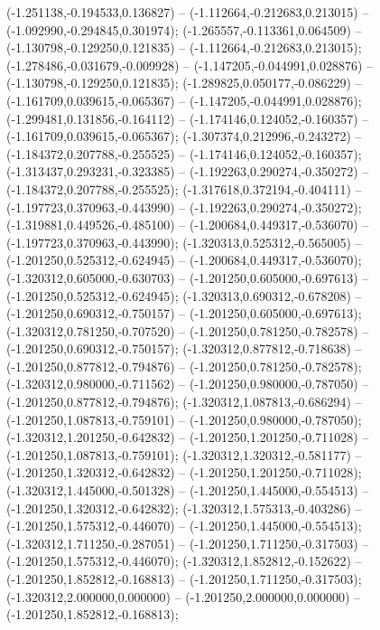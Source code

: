  (-1.251138,-0.194533,0.136827) -- (-1.112664,-0.212683,0.213015) -- (-1.092990,-0.294845,0.301974);
 (-1.265557,-0.113361,0.064509) -- (-1.130798,-0.129250,0.121835) -- (-1.112664,-0.212683,0.213015);
 (-1.278486,-0.031679,-0.009928) -- (-1.147205,-0.044991,0.028876) -- (-1.130798,-0.129250,0.121835);
 (-1.289825,0.050177,-0.086229) -- (-1.161709,0.039615,-0.065367) -- (-1.147205,-0.044991,0.028876);
 (-1.299481,0.131856,-0.164112) -- (-1.174146,0.124052,-0.160357) -- (-1.161709,0.039615,-0.065367);
 (-1.307374,0.212996,-0.243272) -- (-1.184372,0.207788,-0.255525) -- (-1.174146,0.124052,-0.160357);
 (-1.313437,0.293231,-0.323385) -- (-1.192263,0.290274,-0.350272) -- (-1.184372,0.207788,-0.255525);
 (-1.317618,0.372194,-0.404111) -- (-1.197723,0.370963,-0.443990) -- (-1.192263,0.290274,-0.350272);
 (-1.319881,0.449526,-0.485100) -- (-1.200684,0.449317,-0.536070) -- (-1.197723,0.370963,-0.443990);
 (-1.320313,0.525312,-0.565005) -- (-1.201250,0.525312,-0.624945) -- (-1.200684,0.449317,-0.536070);
 (-1.320312,0.605000,-0.630703) -- (-1.201250,0.605000,-0.697613) -- (-1.201250,0.525312,-0.624945);
 (-1.320313,0.690312,-0.678208) -- (-1.201250,0.690312,-0.750157) -- (-1.201250,0.605000,-0.697613);
 (-1.320312,0.781250,-0.707520) -- (-1.201250,0.781250,-0.782578) -- (-1.201250,0.690312,-0.750157);
 (-1.320312,0.877812,-0.718638) -- (-1.201250,0.877812,-0.794876) -- (-1.201250,0.781250,-0.782578);
 (-1.320312,0.980000,-0.711562) -- (-1.201250,0.980000,-0.787050) -- (-1.201250,0.877812,-0.794876);
 (-1.320312,1.087813,-0.686294) -- (-1.201250,1.087813,-0.759101) -- (-1.201250,0.980000,-0.787050);
 (-1.320312,1.201250,-0.642832) -- (-1.201250,1.201250,-0.711028) -- (-1.201250,1.087813,-0.759101);
 (-1.320312,1.320312,-0.581177) -- (-1.201250,1.320312,-0.642832) -- (-1.201250,1.201250,-0.711028);
 (-1.320312,1.445000,-0.501328) -- (-1.201250,1.445000,-0.554513) -- (-1.201250,1.320312,-0.642832);
 (-1.320312,1.575313,-0.403286) -- (-1.201250,1.575312,-0.446070) -- (-1.201250,1.445000,-0.554513);
 (-1.320312,1.711250,-0.287051) -- (-1.201250,1.711250,-0.317503) -- (-1.201250,1.575312,-0.446070);
 (-1.320312,1.852812,-0.152622) -- (-1.201250,1.852812,-0.168813) -- (-1.201250,1.711250,-0.317503);
 (-1.320312,2.000000,0.000000) -- (-1.201250,2.000000,0.000000) -- (-1.201250,1.852812,-0.168813);
